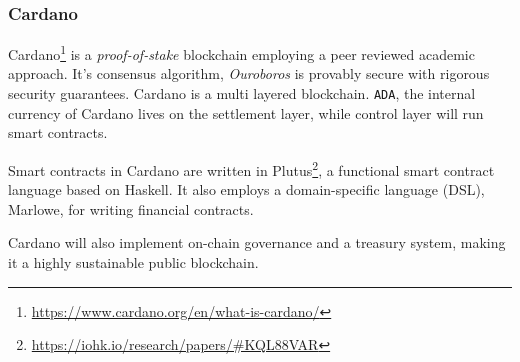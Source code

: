 \subsubsection{Cardano}
Cardano\footnote{\url{https://www.cardano.org/en/what-is-cardano/}} is a \textit{proof-of-stake} blockchain employing a peer reviewed academic approach. It's consensus algorithm, \textit{Ouroboros}\cite{kiayias2017ouroboros} is provably secure with rigorous security guarantees. Cardano is a multi layered blockchain. \texttt{ADA}, the internal currency of Cardano lives on the settlement layer, while control layer will run smart contracts.

Smart contracts in Cardano are written in Plutus\footnote{\url{https://iohk.io/research/papers/\#KQL88VAR}}, a functional smart contract language based on Haskell. It also employs a domain-specific language (DSL), Marlowe\cite{seijas2018marlowe}, for writing financial contracts.

Cardano will also implement on-chain governance and a {treasury system}\cite{zhang2019treasury}, making it a highly sustainable public blockchain.
